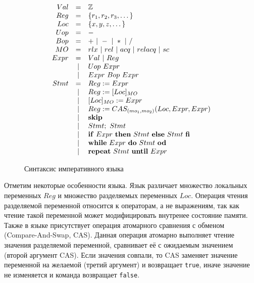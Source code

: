 \begin{figure}[hbt]
\begin{minipage}{\linewidth}

\[
\begin{array}{rcl}
Val         & = &   \mathbb{Z}                                  \\
Reg         & = &   \{r_1, r_2, r_3, \dots\}                    \\
Loc         & = &   \{x, y, z, \dots\}                          \\
Uop         & = &   -                                           \\
Bop         & = &   + ~|~ - ~|~ * ~|~ /                         \\
MO          & = &   rlx ~|~ rel ~|~ acq ~|~ relacq ~|~ sc       \\
Expr        & = &   Val ~|~ Reg                                 \\
            & | &   Uop~Expr                                     \\
            & | &   Expr~Bop~Expr                                \\
Stmt        & = &   Reg := Expr                                 \\
            & | &   Reg := [Loc]_{MO}                            \\
            & | &   [Loc]_{MO} := Expr                            \\
            & | &   Reg := CAS_{(mo_1, mo_2)}(Loc, Expr, Expr)   \\
            & | &   {\mbox{\textbf{skip}}}                               \\
            & | &   Stmt;~Stmt                                   \\
            & | &   {\mbox{\textbf{if}}}~Expr~{\mbox{\textbf{then}}}~Stmt~{\mbox{\textbf{else}}}~Stmt~{\mbox{\textbf{fi}}}       \\
            & | &   {\mbox{\textbf{while}}}~Expr~{\mbox{\textbf{do}}}~Stmt~{\mbox{\textbf{od}}}                          \\
            & | &   {\mbox{\textbf{repeat}}}~Stmt~{\mbox{\textbf{until}}}~Expr                                  
\end{array}
\]

\end{minipage}
\caption{Синтаксис императивного языка}
\label{fig:implang-syntax}
\end{figure}

Отметим некоторые особенности языка.
Язык различает множество локальных переменных $Reg$ 
и множество разделяемых переменных $Loc$.
Операция чтения разделяемой переменной относится к операторам, 
а не выражениям, так как чтение такой переменной может 
модифицировать внутренее состояние памяти. 
Также в языке присутствует операция атомарного сравнения с обменом
(Compare-And-Swap, CAS).
Данная операция атомарно выполняет чтение значения разделяемой переменной,
сравнивает её с ожидаемым значением (второй аргумент CAS).
Если значения совпали, то CAS заменяет значение переменной на желаемой 
(третий аргумент) и возвращает \texttt{true}, 
иначе значение не изменяется и команда возвращает \texttt{false}.

